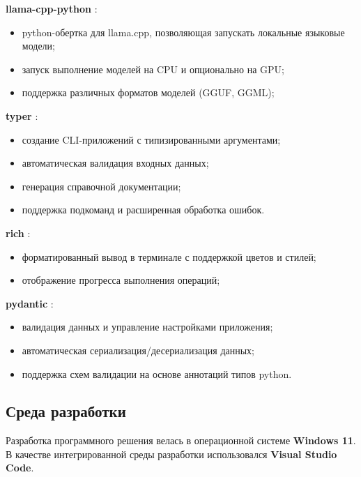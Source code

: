 \begin{enumdescript}
	\item \textbf{llama-cpp-python} \cite{llama_cpp_lib}:
	\begin{itemize}
		\item python-обертка для llama.cpp, позволяющая запускать локальные языковые модели;
		\item запуск выполнение моделей на CPU и опционально на GPU;
		\item поддержка различных форматов моделей (GGUF, GGML);
	\end{itemize}
	
	\item \textbf{typer} \cite{typer_lib}:
	\begin{itemize}
		\item создание CLI-приложений с типизированными аргументами;
		\item автоматическая валидация входных данных;
		\item генерация справочной документации;
		\item поддержка подкоманд и расширенная обработка ошибок.
	\end{itemize}
	
	\item \textbf{rich} \cite{rich_lib}:
	\begin{itemize}
		\item форматированный вывод в терминале с поддержкой цветов и стилей;
		\item отображение прогресса выполнения операций;
	\end{itemize}
	
	\item \textbf{pydantic} \cite{pydantic_lib}:
	\begin{itemize}
		\item валидация данных и управление настройками приложения;
		\item автоматическая сериализация/десериализация данных;
		\item поддержка схем валидации на основе аннотаций типов python.
	\end{itemize}
\end{enumdescript}

\subsection{Среда разработки}

Разработка программного решения велась в операционной системе \textbf{Windows 11}. В качестве интегрированной среды разработки использовался \textbf{Visual Studio Code}.

